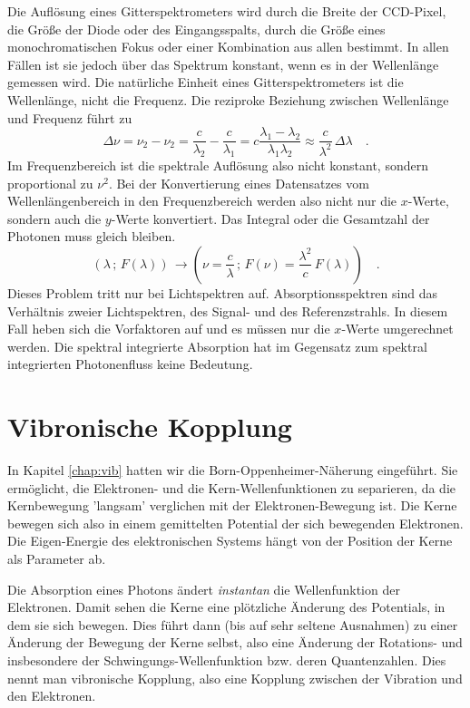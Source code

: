 Die Auflösung eines Gitterspektrometers wird durch die Breite der CCD-Pixel, die Größe der Diode oder des Eingangsspalts, durch die Größe eines monochromatischen Fokus oder einer Kombination aus allen bestimmt. In allen Fällen ist sie jedoch über das Spektrum konstant, wenn es in der Wellenlänge gemessen wird. Die natürliche Einheit eines Gitterspektrometers ist die Wellenlänge, nicht die Frequenz. Die reziproke Beziehung zwischen Wellenlänge und Frequenz führt zu 
\begin{equation}
 \Delta \nu = \nu_2 - \nu_2 = \frac{c}{\lambda_2} - \frac{c}{\lambda_1}  = c \frac{\lambda_1 - \lambda_2}{\lambda_1 \lambda_2} \approx \frac{c}{\lambda^2} \, \Delta \lambda \quad .
\end{equation}
Im Frequenzbereich ist die spektrale Auflösung also nicht konstant, sondern proportional zu $\nu^2$. Bei der Konvertierung eines Datensatzes vom Wellenlängenbereich in den Frequenzbereich werden also nicht nur die $x$-Werte, sondern auch die $y$-Werte konvertiert. Das Integral oder die Gesamtzahl der Photonen muss gleich bleiben.
\begin{equation}
 \left( \lambda \, ; \, F(\lambda) \right) \, \rightarrow  \left( \nu = \frac{c}{ \lambda} \, ; \,  F(\nu) = \frac{\lambda^2}{ c } \, F(\lambda) \right)  \quad .
\end{equation}
Dieses Problem tritt nur bei Lichtspektren auf. Absorptionsspektren sind das Verhältnis zweier Lichtspektren, des Signal- und des Referenzstrahls. In diesem Fall heben sich die Vorfaktoren auf und es müssen nur die $x$-Werte umgerechnet werden. Die spektral integrierte Absorption hat im Gegensatz zum spektral integrierten Photonenfluss keine Bedeutung.



\section{Vibronische Kopplung}

In Kapitel \ref{chap:vib} hatten wir die Born-Oppenheimer-Näherung eingeführt. Sie ermöglicht, die Elektronen- und die Kern-Wellenfunktionen zu separieren, da die Kernbewegung 'langsam' verglichen mit der Elektronen-Bewegung ist. Die Kerne bewegen sich also in einem gemittelten Potential der sich bewegenden Elektronen. Die Eigen-Energie des elektronischen Systems hängt von der Position der Kerne als Parameter ab.

Die Absorption eines Photons ändert \emph{instantan} die Wellenfunktion der Elektronen. Damit sehen die Kerne eine plötzliche Änderung des Potentials, in dem sie sich bewegen. Dies führt dann (bis auf sehr seltene Ausnahmen) zu einer Änderung der Bewegung der Kerne selbst, also eine Änderung der Rotations- und insbesondere der Schwingungs-Wellenfunktion bzw. deren Quantenzahlen. Dies nennt man vibronische Kopplung, also eine Kopplung zwischen der Vibration und den Elektronen.

